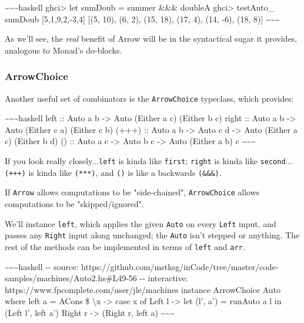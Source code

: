 \documentclass[]{article}
\begin{document}
\textasciitilde{}\textasciitilde{}\textasciitilde{}haskell ghci\textgreater{}
let sumDoub = summer \&\&\& doubleA ghci\textgreater{} testAuto\_ sumDoub
{[}5,1,9,2,-3,4{]} {[}(5, 10), (6, 2), (15, 18), (17, 4), (14, -6), (18, 8){]}
\textasciitilde{}\textasciitilde{}\textasciitilde{}

As we'll see, the \emph{real} benefit of Arrow will be in the syntactical sugar
it provides, analogous to Monad's do-blocks.

\subsubsection{ArrowChoice}

Another useful set of combinators is the \texttt{ArrowChoice} typeclass, which
provides:

\textasciitilde{}\textasciitilde{}\textasciitilde{}haskell left :: Auto a b
-\textgreater{} Auto (Either a c) (Either b c) right :: Auto a b -\textgreater{}
Auto (Either c a) (Either c b) (+++) :: Auto a b -\textgreater{} Auto c d
-\textgreater{} Auto (Either a c) (Either b d) (\textbar{}\textbar{}\textbar{})
:: Auto a c -\textgreater{} Auto b c -\textgreater{} Auto (Either a b) c
\textasciitilde{}\textasciitilde{}\textasciitilde{}

If you look really closely...\texttt{left} is kinda like \texttt{first};
\texttt{right} is kinda like \texttt{second}...\texttt{(+++)} is kinda like
\texttt{(***)}, and \texttt{(\textbar{}\textbar{}\textbar{})} is like a
backwards \texttt{(\&\&\&)}.

If \texttt{Arrow} allows computations to be "side-chained", \texttt{ArrowChoice}
allows computations to be "skipped/ignored".

We'll instance \texttt{left}, which applies the given \texttt{Auto} on every
\texttt{Left} input, and passes any \texttt{Right} input along unchanged; the
\texttt{Auto} isn't stepped or anything. The rest of the methods can be
implemented in terms of \texttt{left} and \texttt{arr}.

\textasciitilde{}\textasciitilde{}\textasciitilde{}haskell -\/- source:
https://github.com/mstksg/inCode/tree/master/code-samples/machines/Auto2.hs\#L49-56
-\/- interactive: https://www.fpcomplete.com/user/jle/machines instance
ArrowChoice Auto where left a = ACons \$ \textbackslash{}x -\textgreater{} case
x of Left l -\textgreater{} let (l', a') = runAuto a l in (Left l', left a')
Right r -\textgreater{} (Right r, left a)
\textasciitilde{}\textasciitilde{}\textasciitilde{}
\end{document}
